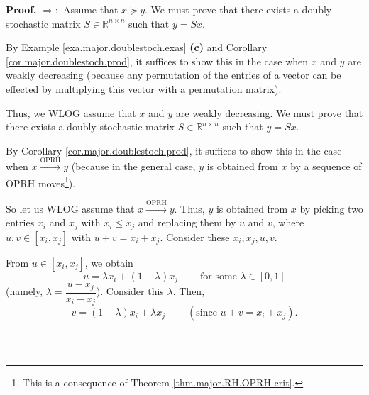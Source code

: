 \documentclass[numbers=enddot,12pt,final,onecolumn,notitlepage]{scrartcl}%
\numberwithin{exer}{subsection}
\theoremstyle{definition}
\newenvironment{proof}[1][Proof]{\noindent\textbf{#1.} }{\ \rule{0.5em}{0.5em}}
\begin{document}
\begin{proof}
$\Longrightarrow:$ Assume that $x\succcurlyeq y$. We must prove that there
exists a doubly stochastic matrix $S\in\mathbb{R}^{n\times n}$ such that
$y=Sx$.

By Example \ref{exa.major.doublestoch.exas} \textbf{(c)} and Corollary
\ref{cor.major.doublestoch.prod}, it suffices to show this in the case when
$x$ and $y$ are weakly decreasing (because any permutation of the entries of a
vector can be effected by multiplying this vector with a permutation matrix).

Thus, we WLOG assume that $x$ and $y$ are weakly decreasing. We must prove
that there exists a doubly stochastic matrix $S\in\mathbb{R}^{n\times n}$ such
that $y=Sx$.

By Corollary \ref{cor.major.doublestoch.prod}, it suffices to show this in the
case when $x\overset{\text{OPRH}}{\longrightarrow}y$ (because in the general
case, $y$ is obtained from $x$ by a sequence of OPRH moves\footnote{This is a
consequence of Theorem \ref{thm.major.RH.OPRH-crit}.}).

So let us WLOG assume that $x\overset{\text{OPRH}}{\longrightarrow}y$. Thus,
$y$ is obtained from $x$ by picking two entries $x_{i}$ and $x_{j}$ with
$x_{i}\leq x_{j}$ and replacing them by $u$ and $v$, where $u,v\in\left[
x_{i},x_{j}\right]  $ with $u+v=x_{i}+x_{j}$. Consider these $x_{i},x_{j},u,v$.

From $u\in\left[  x_{i},x_{j}\right]  $, we obtain
\[
u=\lambda x_{i}+\left(  1-\lambda\right)  x_{j}\ \ \ \ \ \ \ \ \ \ \text{for
some }\lambda\in\left[  0,1\right]
\]
(namely, $\lambda=\dfrac{u-x_{j}}{x_{i}-x_{j}}$). Consider this $\lambda$.
Then,%
\[
v=\left(  1-\lambda\right)  x_{i}+\lambda x_{j}\ \ \ \ \ \ \ \ \ \ \left(
\text{since }u+v=x_{i}+x_{j}\right)  .
\]



\end{proof}
\end{document}
